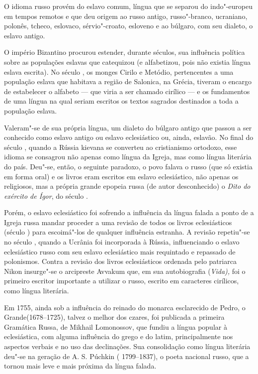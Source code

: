 O idioma russo provém do eslavo comum, língua que se separou do
indo"-europeu em tempos remotos e que deu origem ao russo antigo,
russo"-branco, ucraniano, polonês, tcheco, eslovaco, sérvio"-croato,
esloveno e ao búlgaro, com seu dialeto, o eslavo antigo.

O império Bizantino procurou estender, durante séculos, sua influência
política sobre as populações eslavas que catequizou (e alfabetizou, pois
não existia língua eslava escrita). No século , os monges Cirilo e
Metódio, pertencentes a uma população eslava que habitava a região de
Salonica, na Grécia, tiveram o encargo de estabelecer o alfabeto --- que
viria a ser chamado cirílico --- e os fundamentos de uma língua na qual
seriam escritos os textos sagrados destinados a toda a população eslava.

Valeram"-se de sua própria língua, um dialeto do búlgaro antigo que
passou a ser conhecido como eslavo antigo ou eslavo eclesiástico ou,
ainda, eslavão. No final do século , quando a Rússia kievana se
converteu ao cristianismo ortodoxo, esse idioma se consagrou não apenas
como língua da Igreja, mas como língua literária do país. Deu"-se, então,
o seguinte paradoxo, o povo falava o russo (que só existia em forma
oral) e os livros eram
escritos em eslavo eclesiástico, não apenas os religiosos, mas a própria
grande epopeia russa (de autor desconhecido) o \emph{Dito do exército de
Ígor}, do século .

Porém, o eslavo eclesiástico foi sofrendo a influência da língua falada
a ponto de a Igreja russa mandar proceder a uma revisão de todos os
livros eclesiásticos (século ) para escoimá"-los de qualquer
influência estranha. A revisão repetiu"-se no século , quando a
Ucrânia foi incorporada à Rússia, influenciando o eslavo eclesiástico
russo com seu eslavo eclesiástico mais requintado e repassado de
polonismos. Contra a revisão dos livros eclesiásticos ordenada pelo
patriarca Nikon insurge"-se o arcipreste Avvakum que, em sua
autobiografia (\emph{Vida),} foi o primeiro escritor importante a
utilizar o russo, escrito em caracteres cirílicos, como língua literária.

Em 1755, ainda sob a influência do reinado do monarca esclarecido de Pedro, o
Grande(1678--1725), talvez o melhor dos czares, foi publicada a primeira
Gramática Russa, de Mikhail Lomonossov, que fundiu a língua popular à
eclesiástica, com alguma influência do grego e do latim,
 principalmente nos aspectos verbais e no uso das declinações. Sua
consolidação como língua literária deu"-se na geração de A. S. Púchkin (
1799--1837), o poeta nacional russo, que a tornou mais leve e mais
próxima da língua falada.

